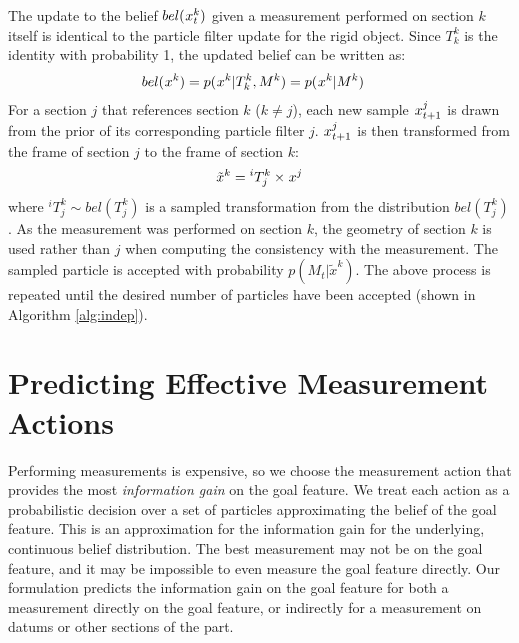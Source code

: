 \documentclass[letterpaper, 10 pt, conference]{ieeeconf}
\newcommand{\sampled}{\tilde}
\begin{document}
The update to the belief $bel(\particle[t][][k])$ given a measurement performed on section $k$ itself is identical to the particle filter update for the rigid object. 
Since $T^k_k$ is the identity with probability 1, the updated belief can be written as:
\begin{align}
bel(\particle[][][k]) &= p(\particle[][][k]|T^k_k,M^k) =p(\particle[][][k]|M^k)
\end{align}
For a section $j$ that references section $k$ ($k \neq j$), each new sample $\particle[t+1][][j]$ is drawn from the prior of its corresponding particle filter $j$. 
$\particle[t+1][][j]$ is then transformed from the frame of section $j$ to the frame of section $k$: 
\begin{align}
\sampled{x}^k = {^iT^k_j} \times \particle[][][j]
\end{align}
where $ ^iT^k_j \sim bel(T^k_j)$ is a sampled transformation from the distribution $bel(T^k_j)$.
As the measurement was performed on section $k$, the geometry of section $k$ is used rather than $j$ when computing the consistency with the measurement. 
The sampled particle is accepted with probability $p(M_t|\sampled{x}^k)$. 
The above process is repeated until the desired number of particles have been accepted (shown in Algorithm \ref{alg:indep}).




\section{Predicting Effective Measurement Actions} \label{sec:information gain}
Performing measurements is expensive, so we choose the measurement action that provides the most \textit{information gain} on the goal feature. 
We treat each action as a probabilistic decision over a set of particles approximating the belief of the goal feature.
This is an approximation for the information gain for the underlying, continuous belief distribution.
The best measurement may not be on the goal feature, and it may be impossible to even measure the goal feature directly.
Our formulation predicts the information gain on the goal feature for both a measurement directly on the goal feature, or indirectly for a measurement on datums or other sections of the part.
\end{document}
